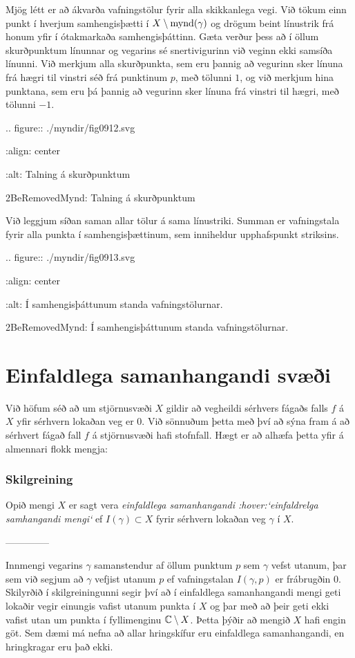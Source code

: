Mjög létt er að ákvarða vafningstölur fyrir alla skikkanlega
vegi.   Við tökum einn punkt í hverjum samhengisþætti í
$X\setminus{{\operatorname{mynd}(\gamma)}}$  og drögum beint línustrik frá honum yfir í
ótakmarkaða samhengisþáttinn.  Gæta verður þess að í öllum
skurðpunktum línunnar og vegarins sé snertivigurinn við veginn  ekki
samsíða línunni.    Við merkjum alla skurðpunkta, sem eru þannig að
vegurinn sker línuna frá hægri til vinstri séð frá punktinum $p$, 
með tölunni $1$, og við
merkjum hina punktana, sem eru þá þannig að vegurinn sker línuna frá
vinstri til hægri, með tölunni $-1$.  

.. figure:: ./myndir/fig0912.svg

    :align: center

    :alt: Talning á skurðpunktum

    2BeRemovedMynd: Talning á skurðpunktum


\noindent
Við leggjum síðan saman allar tölur á sama línustriki.  Summan er
vafningstala fyrir alla punkta í samhengisþættinum, sem inniheldur 
upphafspunkt striksins. 

.. figure:: ./myndir/fig0913.svg

    :align: center

    :alt: Í samhengisþáttunum standa vafningstölurnar.

    2BeRemovedMynd: Í samhengisþáttunum standa vafningstölurnar.


 
\section {Einfaldlega samanhangandi svæði}

\noindent
Við höfum séð að um stjörnusvæði $X$ gildir að
vegheildi sérhvers fágaðs falls $f$ á $X$ yfir sérhvern lokaðan veg
er $0$.  Við sönnuðum þetta með því að sýna fram á að sérhvert fágað
fall $f$ á stjörnusvæði hafi stofnfall.  Hægt er að alhæfa þetta yfir
á almennari flokk mengja:

\subsubsection{Skilgreining}  Opið mengi $X$ er sagt vera {\it einfaldlega
samanhangandi :hover:`einfaldrelga samhangandi mengi`} ef
$I(\gamma)\subset X$ fyrir sérhvern lokaðan veg $\gamma$ í $X$.


--------------



Innmengi vegarins $\gamma$ samanstendur af öllum punktum $p$ sem
$\gamma$ vefst utanum, þar sem við segjum að $\gamma$ vefjist utanum 
$p$ ef vafningstalan $I(\gamma,p)$ er frábrugðin $0$.
Skilyrðið í skilgreiningunni segir því að í einfaldlega samanhangandi
mengi geti lokaðir vegir einungis vafist utanum punkta í $X$ og þar
með að þeir geti ekki vafist utan um punkta í fyllimenginu
${\mathbb C}\setminus X$.  Þetta þýðir að mengið $X$ hafi engin göt.  Sem dæmi
má nefna að allar hringskífur eru einfaldlega samanhangandi, en
hringkragar eru það ekki.    

